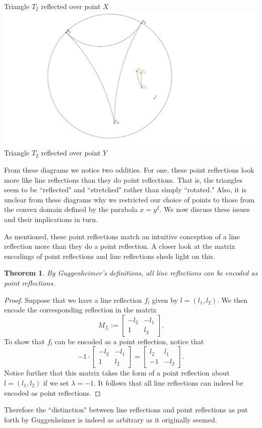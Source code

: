 \documentclass[12pt]{article}
\newcommand{\lftmat}[4]{\begin{bmatrix} {#1} & {#2} \\ {#3} & {#4} \end{bmatrix}}
\newcommand{\linenoendmat}[2]{\begin{bmatrix} -{#2} & -{#1} \\ 1 & {#2} \end{bmatrix}}
\newcommand{\stanlinenoendmat}{\linenoendmat{l_1}{l_2}}
\theoremstyle{plain}
\newtheorem{theorem}{Theorem}[section]
\theoremstyle{definition}
\begin{document}
\begin{center}
Triangle $T_2$ reflected over point $X$
\[\]
\includegraphics[width=160mm]{../images/t2_over_y.png} \\
Triangle $T_2$ reflected over point $Y$ 
\end{center}

From these diagrams we notice two oddities. For one, these point reflections look more like line reflections than they do point reflections. That is, the triangles seem to be ``reflected" and ``stretched" rather than simply ``rotated." Also, it is unclear from these diagrams why we restricted our choice of points to those from the convex domain defined by the parabola $x = y^2$. We now discuss these issues and their implications in turn.

As mentioned, these point reflections match an intuitive conception of a line reflection more than they do a point reflection. A closer look at the matrix encodings of point reflections and line reflections sheds light on this. 

\begin{theorem}
By Guggenheimer's definitions, all line reflections can be encoded as point reflections. 
\end{theorem}

\begin{proof}
Suppose that we have a line reflection $f_l$ given by $l = (l_1, l_2)$. We then encode the corresponding reflection in the matrix 
\[ M_{f_l} := \stanlinenoendmat. \]
To show that $f_l$ can be encoded as a point reflection, notice that 
\[ -1 \cdot \stanlinenoendmat = \lftmat{l_2}{l_1}{-1}{-l_2}.\]
Notice further that this matrix takes the form of a point reflection about $l = (l_1, l_2)$ if we set $\lambda = -1$. It follows that all line reflections can indeed be encoded as point reflections.
\end{proof}

Therefore the ``distinction" between line reflections and point reflections as put forth by Guggenheimer is indeed as arbitrary as it originally seemed. 
\end{document}

